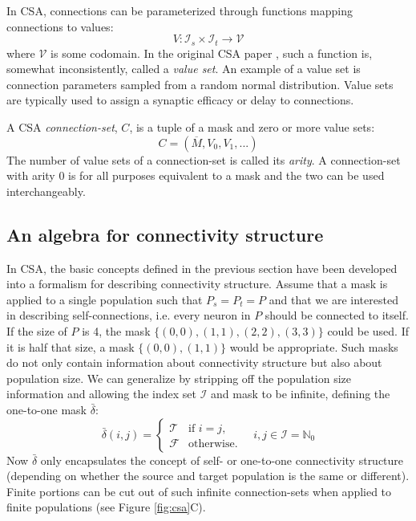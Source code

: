 \documentclass{frontiersSCNS} %
\begin{document}
In CSA, connections can be parameterized through functions mapping
connections to values:
\begin{equation}
V : \mathcal{I}_s \times \mathcal{I}_t \rightarrow \mathcal{V}
\end{equation}
where $\mathcal{V}$ is some codomain. In the original CSA paper
\citep{djurfeldt12}, such a function is, somewhat inconsistently,
called a \emph{value set}. An example of a value set is connection
parameters sampled from a random normal distribution. Value sets are
typically used to assign a synaptic efficacy or delay to connections.

A CSA \emph{connection-set}, $C$, is a tuple of a mask and zero or
more value sets:
\begin{equation}
C = (\overline{M}, V_0, V_1, ...)
\end{equation}
The number of value sets of a connection-set is called its
\emph{arity}. A connection-set with arity 0 is for all purposes
equivalent to a mask and the two can be used interchangeably.

\subsection{An algebra for connectivity structure}\label{sec:structure}

In CSA, the basic concepts defined in the previous section have been
developed into a formalism for describing connectivity structure.
Assume that a mask is applied to a single population such that $P_s =
P_t = P$ and that we are interested in describing self-connections,
i.e. every neuron in $P$ should be connected to itself.  If the size
of $P$ is 4, the mask $\{(0, 0), (1, 1), (2, 2), (3, 3)\}$ could be
used.  If it is half that size, a mask $\{(0, 0), (1, 1)\}$ would be
appropriate. Such masks do not only contain information about
connectivity structure but also about population size. We can
generalize by stripping off the population size information and
allowing the index set $\mathcal{I}$ and mask to be infinite, defining
the one-to-one mask $\bar{\delta}$:
\begin{equation}
  \bar{\delta}(i, j) =
      \begin{cases}
        \mathcal{T}& \text{if $i = j$},\\
        \mathcal{F}& \text{otherwise}.
      \end{cases}
      \quad i, j \in \mathcal{I} = \mathbb{N}_0
\end{equation}
Now $\bar{\delta}$ only encapsulates the concept of self- or
one-to-one connectivity structure (depending on whether the source and
target population is the same or different).  Finite portions can be
cut out of such infinite connection-sets when applied to finite
populations (see Figure \ref{fig:csa}C).
\end{document}
